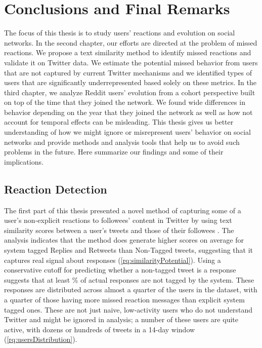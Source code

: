 \chapter{Conclusions and Final Remarks}
\label{ch:conclusions}

The focus of this thesis is to study users' reactions and evolution on social networks. In the second chapter, our efforts are directed at the problem of missed reactions. We propose a text similarity method to identify missed reactions and validate it on Twitter data. We estimate the potential missed behavior from users that are not captured by current Twitter mechanisms and we identified types of users that are significantly underrepresented based solely on these metrics. In the third chapter, we analyze Reddit users' evolution from a cohort perspective built on top of the time that they joined the network. We found wide differences in behavior depending on the year that they joined the network as well as how not account for temporal effects can be misleading. This thesis gives us better understanding of how we might ignore or misrepresent users' behavior on social networks and provide methods and analysis tools that help us to avoid such problems in the future. Here summarize our findings and some of their implications.

\section{Reaction Detection}

The first part of this thesis presented a novel method of capturing some of a user's non-explicit reactions to followees' content in Twitter by using text similarity scores between a user's tweets and those of their followees \cite{Barbosa}.  The analysis indicates that the method does generate higher scores on average for system tagged Replies and Retweets than Non-Tagged tweets, suggesting that it captures real signal about responses (\ref{rq:similarityPotential}).  Using a conservative cutoff for predicting whether a non-tagged tweet is a response suggests that at least \highNonTaggedTweetCountPct{}\% of actual responses are not tagged by the system.  These responses are distributed across almost a quarter of the users in the dataset, with a quarter of those having more missed reaction messages than explicit system tagged ones. These are not just naive, low-activity users who do not understand Twitter and might be ignored in analysis; a number of these users are quite active, with dozens or hundreds of tweets in a 14-day window (\ref{rq:usersDistribution}).  

